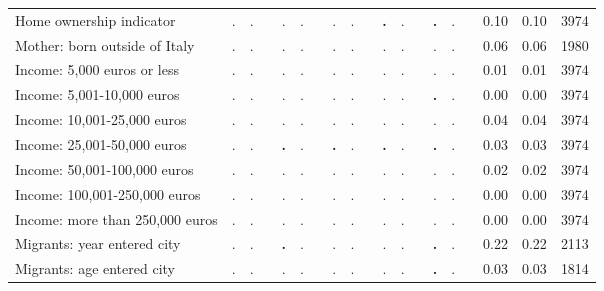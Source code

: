 \begin{tabular}{l c c c c c c c c c c c c c c c c c c}
Home ownership indicator &         . &         . & &         . &         . & &         . &         . & & \textbf{        .} &         . & & \textbf{        .} &         . & &      0.10 &      0.10 &      3974 \\
Mother: born outside of Italy &         . &         . & &         . &         . & &         . &         . & &         . &         . & &         . &         . & &      0.06 &      0.06 &      1980 \\
Income: 5,000 euros or less &         . &         . & &         . &         . & &         . &         . & &         . &         . & &         . &         . & &      0.01 &      0.01 &      3974 \\
Income: 5,001-10,000 euros &         . &         . & &         . &         . & &         . &         . & &         . &         . & & \textbf{        .} &         . & &      0.00 &      0.00 &      3974 \\
Income: 10,001-25,000 euros &         . &         . & &         . &         . & &         . &         . & &         . &         . & &         . &         . & &      0.04 &      0.04 &      3974 \\
Income: 25,001-50,000 euros &         . &         . & & \textbf{        .} &         . & & \textbf{        .} &         . & & \textbf{        .} &         . & & \textbf{        .} &         . & &      0.03 &      0.03 &      3974 \\
Income: 50,001-100,000 euros &         . &         . & &         . &         . & &         . &         . & &         . &         . & &         . &         . & &      0.02 &      0.02 &      3974 \\
Income: 100,001-250,000 euros &         . &         . & &         . &         . & &         . &         . & &         . &         . & &         . &         . & &      0.00 &      0.00 &      3974 \\
Income: more than 250,000 euros &         . &         . & &         . &         . & &         . &         . & &         . &         . & &         . &         . & &      0.00 &      0.00 &      3974 \\
Migrants: year entered city &         . &         . & & \textbf{        .} &         . & &         . &         . & &         . &         . & & \textbf{        .} &         . & &      0.22 &      0.22 &      2113 \\
Migrants: age entered city &         . &         . & &         . &         . & &         . &         . & &         . &         . & & \textbf{        .} &         . & &      0.03 &      0.03 &      1814 \\
\bottomrule
\end{tabular}
